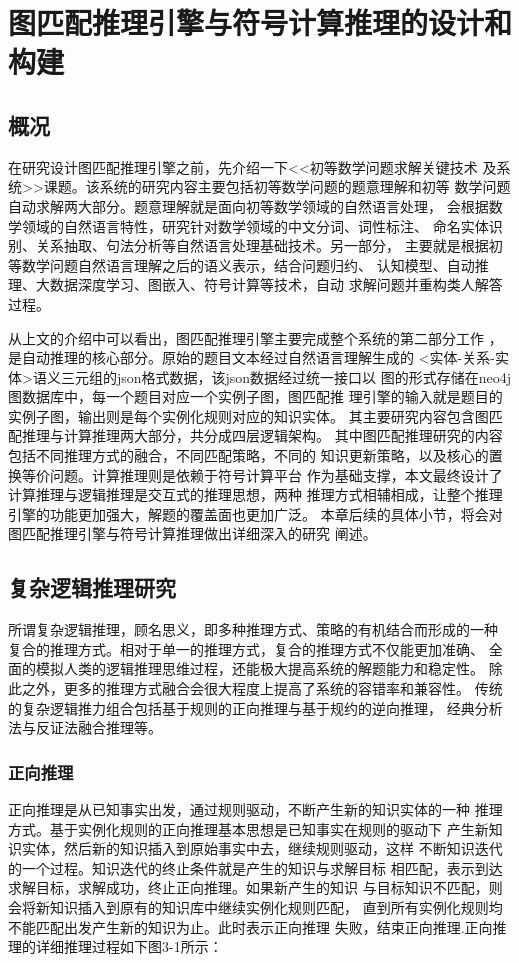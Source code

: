 \documentclass{standalone}
\begin{document}
\chapter{图匹配推理引擎与符号计算推理的设计和构建}
\section{概况}
在研究设计图匹配推理引擎之前，先介绍一下<<初等数学问题求解关键技术
及系统>>课题。该系统的研究内容主要包括初等数学问题的题意理解和初等
数学问题自动求解两大部分。题意理解就是面向初等数学领域的自然语言处理，
会根据数学领域的自然语言特性，研究针对数学领域的中文分词、词性标注、
命名实体识别、关系抽取、句法分析等自然语言处理基础技术。另一部分，
主要就是根据初等数学问题自然语言理解之后的语义表示，结合问题归约、
认知模型、自动推理、大数据深度学习、图嵌入、符号计算等技术，自动
求解问题并重构类人解答过程。

从上文的介绍中可以看出，图匹配推理引擎主要完成整个系统的第二部分工作
，是自动推理的核心部分。原始的题目文本经过自然语言理解生成的
<实体-关系-实体>语义三元组的json格式数据，该json数据经过统一接口以
图的形式存储在neo4j图数据库中，每一个题目对应一个实例子图，图匹配推
理引擎的输入就是题目的实例子图，输出则是每个实例化规则对应的知识实体。
其主要研究内容包含图匹配推理与计算推理两大部分，共分成四层逻辑架构。
其中图匹配推理研究的内容包括不同推理方式的融合，不同匹配策略，不同的
知识更新策略，以及核心的置换等价问题。计算推理则是依赖于符号计算平台
作为基础支撑，本文最终设计了计算推理与逻辑推理是交互式的推理思想，两种
推理方式相辅相成，让整个推理引擎的功能更加强大，解题的覆盖面也更加广泛。
本章后续的具体小节，将会对图匹配推理引擎与符号计算推理做出详细深入的研究
阐述。
\section{复杂逻辑推理研究}
所谓复杂逻辑推理，顾名思义，即多种推理方式、策略的有机结合而形成的一种
复合的推理方式。相对于单一的推理方式，复合的推理方式不仅能更加准确、
全面的模拟人类的逻辑推理思维过程，还能极大提高系统的解题能力和稳定性。
除此之外，更多的推理方式融合会很大程度上提高了系统的容错率和兼容性。
传统的复杂逻辑推力组合包括基于规则的正向推理与基于规约的逆向推理，
经典分析法与反证法融合推理等。
\subsection{正向推理}
正向推理是从已知事实出发，通过规则驱动，不断产生新的知识实体的一种
推理方式。基于实例化规则的正向推理基本思想是已知事实在规则的驱动下
产生新知识实体，然后新的知识插入到原始事实中去，继续规则驱动，这样
不断知识迭代的一个过程。知识迭代的终止条件就是产生的知识与求解目标
相匹配，表示到达求解目标，求解成功，终止正向推理。如果新产生的知识
与目标知识不匹配，则会将新知识插入到原有的知识库中继续实例化规则匹配，
直到所有实例化规则均不能匹配出发产生新的知识为止。此时表示正向推理
失败，结束正向推理.正向推理的详细推理过程如下图3-1所示：
\end{document}
